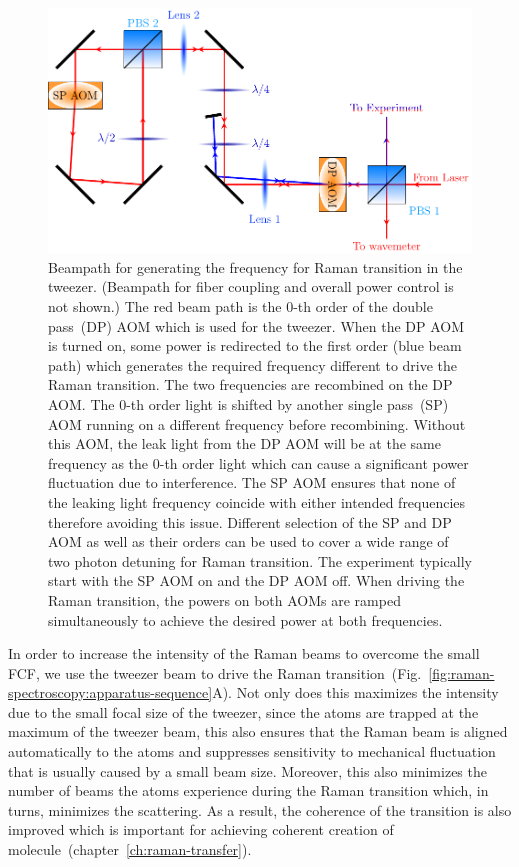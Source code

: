 \begin{figure}
  \centering
  \includegraphics[width=\textwidth]{figures/raman_spectroscopy_raman_beampath.pdf}
  \caption[Beampath to allow driving Raman transition with tweezer]{
    Beampath for generating the frequency for Raman transition in the tweezer.
    (Beampath for fiber coupling and overall power control is not shown.)
    The red beam path is the $0$-th order of the double pass~(DP) AOM
    which is used for the tweezer.
    When the DP AOM is turned on, some power is redirected to the first order
    (blue beam path) which generates the required frequency different to drive
    the Raman transition. The two frequencies are recombined on the DP AOM.
    The $0$-th order light is shifted by another single pass~(SP) AOM
    running on a different frequency before recombining.
    Without this AOM, the leak light from the DP AOM will be at the same frequency
    as the $0$-th order light which can cause a significant power fluctuation
    due to interference. The SP AOM ensures that none of the leaking light frequency
    coincide with either intended frequencies therefore avoiding this issue.
    Different selection of the SP and DP AOM as well as their orders can be used
    to cover a wide range of two photon detuning for Raman transition.
    The experiment typically start with the SP AOM on and the DP AOM off.
    When driving the Raman transition, the powers on both AOMs are ramped simultaneously
    to achieve the desired power at both frequencies.
    \label{fig:raman-spectroscopy:raman-beampath}}
\end{figure}

In order to increase the intensity of the Raman beams to overcome the small FCF,
we use the tweezer beam to drive
the Raman transition~(Fig.~\ref{fig:raman-spectroscopy:apparatus-sequence}A).
Not only does this maximizes the intensity due to the small focal size of the tweezer,
since the atoms are trapped at the maximum of the tweezer beam,
this also ensures that the Raman beam is aligned automatically to the atoms
and suppresses sensitivity to mechanical fluctuation that is usually
caused by a small beam size.
Moreover, this also minimizes the number of beams the atoms experience
during the Raman transition which, in turns, minimizes the scattering.
As a result, the coherence of the transition is also improved
which is important for achieving
coherent creation of molecule~(chapter~\ref{ch:raman-transfer}).

